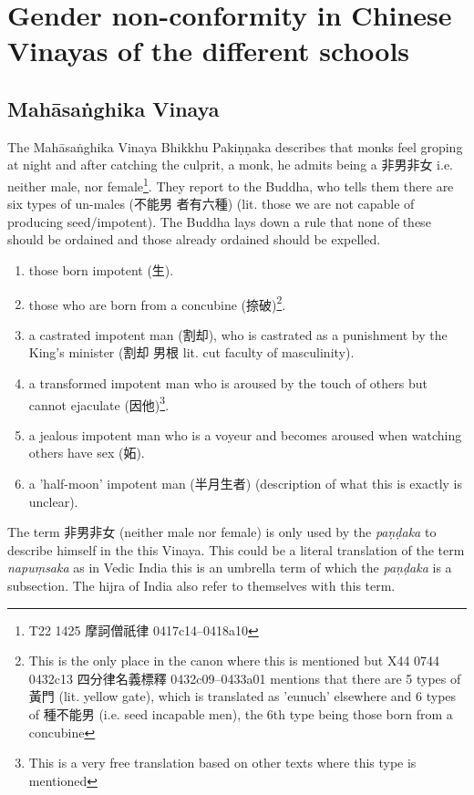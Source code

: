 \section{Gender non-conformity in Chinese Vinayas of the different schools}
\label{appendix1}

\subsection{Mahāsaṅghika Vinaya}
The Mahāsaṅghika Vinaya Bhikkhu Pakiṇṇaka describes that monks feel groping at night and after catching the culprit, a monk, he admits being a 非男非女 i.e. neither male, nor female\footnote{T22 1425 摩訶僧祇律 0417c14–0418a10}. They report to the Buddha, who tells them there are six types of un-males (不能男 者有六種) (lit. those we are not capable of producing seed/impotent). The Buddha lays down a rule that none of these should be ordained and those already ordained should be expelled.

\begin{enumerate}
\item those born impotent (生). 
\item those who are born from a concubine (捺破)\footnote{This is the only place in the canon where this is mentioned but X44 0744 0432c13 四分律名義標釋 0432c09–0433a01 mentions that there are 5 types of 黃門 (lit. yellow gate), which is translated as 'eunuch' elsewhere and 6 types of 種不能男 (i.e. seed incapable men), the 6th type being those born from a concubine}.
\item a castrated impotent man (割却), who is castrated as a punishment by the King's minister (割却 男根 lit. cut faculty of masculinity).
\item a transformed impotent man who is aroused by the touch of others but cannot ejaculate (因他)\footnote{This is a very free translation based on other texts where this type is mentioned}.
\item a jealous impotent man who is a voyeur and becomes aroused when watching others have sex (妬).
\item a 'half-moon' impotent man (半月生者) (description of what this is exactly is unclear).
\end{enumerate}

The term 非男非女 (neither male nor female) is only used by the {\em paṇḍaka} to describe himself in the this Vinaya. This could be a literal translation of the term {\em napuṃsaka} as in Vedic India this is an umbrella term of which the {\em paṇḍaka} is a subsection. The hijra of India also refer to themselves with this term.

